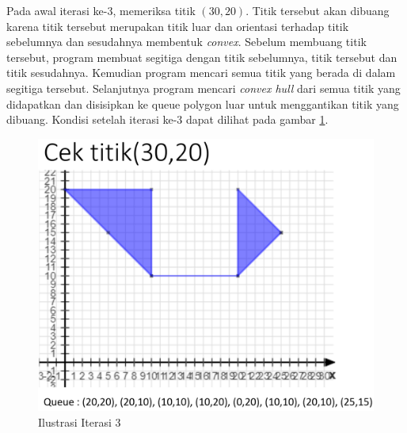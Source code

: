\par Pada awal iterasi ke-3, memeriksa titik $(30,20)$. Titik tersebut akan dibuang karena titik tersebut merupakan titik luar dan orientasi terhadap titik sebelumnya dan sesudahnya membentuk \textit{convex}. Sebelum membuang titik tersebut, program membuat segitiga dengan titik sebelumnya, titik tersebut dan titik sesudahnya. Kemudian program mencari semua titik yang berada di dalam segitiga tersebut. Selanjutnya program mencari \textit{convex hull} dari semua titik yang didapatkan dan disisipkan ke queue polygon luar untuk menggantikan titik yang dibuang. Kondisi setelah iterasi ke-3 dapat dilihat pada gambar \ref{fig:iterasi-3}.
\begin{figure}[!h]
	\Centering
	\includegraphics [width=\columnwidth]{bab5/img/iterasi-3}
	\caption {Ilustrasi Iterasi 3}
	\label {fig:iterasi-3}
\end{figure}

